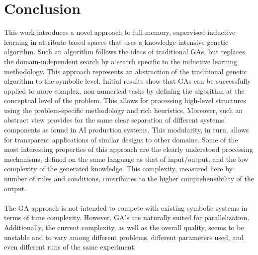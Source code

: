 \documentclass[../main.tex]{subfiles}
\begin{document}
\section{Conclusion}
This work introduces a novel approach to full-memory, supervised inductive learning in attribute-based spaces that uses
a knowledge-intensive genetic algorithm. Such an algorithm follows the ideas of traditional GAs, but replaces the
domain-independent search by a search specific to the inductive learning methodology. This approach represents an
abstraction of the traditional genetic algorithm to the symbolic level. Initial results show that GAs can be
successfully applied to more complex, non-numerical tasks by defining the algorithm at the conceptual level of the
problem. This allows for processing high-level structures using the problem-specific methodology and rich heuristics.
Moreover, such an abstract view provides for the same clear separation of different systems' components as found in AI
production systems. This modularity, in turn, allows for transparent applications of similar designs to other domains.
Some of the most interesting properties of this approach are the clearly understood processing mechanisms, defined on
the same language as that of input/output, and the low complexity of the generated knowledge. This complexity, measured
here by number of rules and conditions, contributes to the higher comprehensibility of the output.
\\\\
The GA approach is not intended to compete with existing symbolic systems in terms of time complexity. However, GA's
are naturally suited for parallelization. Additionally, the current complexity, as well as the overall quality, seems
to be unstable and to vary among different problems, different parameters used, and even different runs of the same
experiment.
\end{document}
